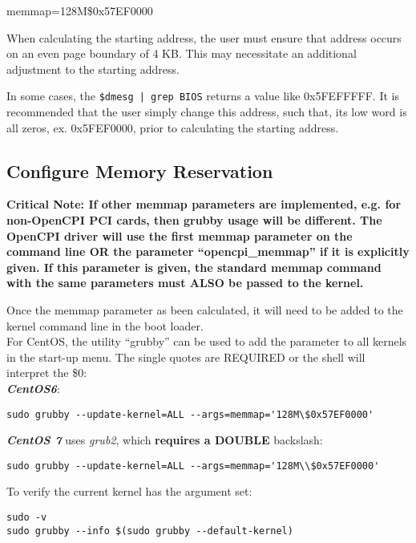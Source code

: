 \begin{flushleft}
memmap=128M\$0x57EF0000 \\ \medskip

When calculating the starting address, the user must ensure that address occurs on an even page boundary of 4 KB. This may necessitate an additional adjustment to the starting address. \\ \medskip

In some cases, the \texttt{\$dmesg | grep BIOS} returns a value like 0x5FEFFFFF. It is recommended that the user simply change this address, such that, its low word is all zeros, ex. 0x5FEF0000, prior to calculating the starting address. \\ \medskip

\subsection{Configure Memory Reservation}
\textbf{Critical Note:
If other memmap parameters are implemented, e.g. for non-OpenCPI PCI cards, then grubby usage will be different. The OpenCPI driver will use the first memmap parameter on the command line OR the parameter ``opencpi\_memmap'' if it is explicitly given. If this parameter is given, the standard memmap command with the same parameters must ALSO be passed to the kernel.}\\ \bigskip

Once the memmap parameter as been calculated, it will need to be added to the kernel command line in the boot loader. \\
\bigskip
For CentOS, the utility ``grubby'' can be used to add the parameter to all kernels in the start-up menu. The single quotes are REQUIRED or the shell will interpret the \$0: \\
\bigskip
\textbf{\textit{CentOS6}}:\\
\begin{lstlisting}
sudo grubby --update-kernel=ALL --args=memmap='128M\$0x57EF0000'
\end{lstlisting}
\textbf{\textit{CentOS 7}} uses \textit{grub2}, which \textbf{requires a DOUBLE} backslash:\\
\begin{lstlisting}
sudo grubby --update-kernel=ALL --args=memmap='128M\\$0x57EF0000'
\end{lstlisting}

To verify the current kernel has the argument set:\\
\begin{lstlisting}
sudo -v
sudo grubby --info $(sudo grubby --default-kernel)
\end{lstlisting}


\end{flushleft}
